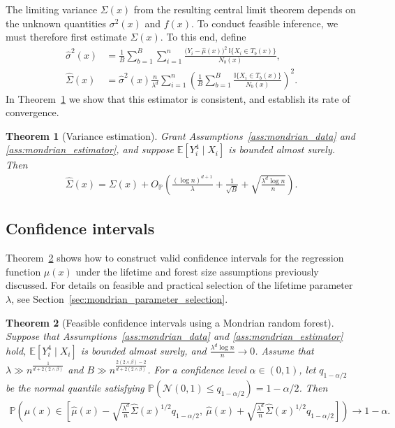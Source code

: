 \documentclass[11pt,lof]{puthesis}
\renewcommand{\P}{\ensuremath{\mathbb{P}}}
\newcommand{\E}{\ensuremath{\mathbb{E}}}
\newcommand{\I}{\ensuremath{\mathbb{I}}}
\newcommand{\cN}{\ensuremath{\mathcal{N}}}
\theoremstyle{break}
\newtheorem{theorem}{Theorem}[section]
\theoremstyle{proof}
\begin{document}
The limiting variance $\Sigma(x)$ from the resulting central limit theorem
depends on the unknown quantities $\sigma^2(x)$ and $f(x)$.
To conduct feasible inference, we must therefore first estimate
$\Sigma(x)$. To this end, define
%
\begin{align}
  \label{eq:mondrian_sigma2_hat}
  \hat\sigma^2(x)
  &=
  \frac{1}{B} \sum_{b=1}^{B} \sum_{i=1}^n
  \frac{\big(Y_i - \hat \mu(x)\big)^2 \, \I\{X_i \in T_b(x)\}} {N_b(x)}, \\
  \nonumber
  \hat\Sigma(x)
  &=
  \hat\sigma^2(x) \frac{n}{\lambda^d} \sum_{i=1}^n
  \left( \frac{1}{B} \sum_{b=1}^B \frac{\I\{X_i \in T_b(x)\}}{N_b(x)} \right)^2.
\end{align}
%
In Theorem~\ref{thm:mondrian_variance_estimation} we show that this
estimator is consistent, and establish its rate of convergence.
%
\begin{theorem}[Variance estimation]%
  \label{thm:mondrian_variance_estimation}
  Grant Assumptions~\ref{ass:mondrian_data} and \ref{ass:mondrian_estimator},
  and
  suppose $\E[Y_i^4 \mid X_i ]$ is bounded almost surely. Then
  \begin{align*}
    \hat\Sigma(x)
    = \Sigma(x)
    + O_\P \left(
      \frac{(\log n)^{d+1}}{\lambda}
      + \frac{1}{\sqrt B} + \sqrt{\frac{\lambda^d \log n}{n}}
    \right).
  \end{align*}

\end{theorem}

\subsection{Confidence intervals}

Theorem~\ref{thm:mondrian_confidence} shows how to construct valid confidence
intervals
for the regression function $\mu(x)$ under the lifetime and forest size
assumptions previously discussed. For details on feasible and practical
selection of the lifetime parameter $\lambda$, see
Section~\ref{sec:mondrian_parameter_selection}.
%
\begin{theorem}[Feasible confidence intervals using a Mondrian random forest]%
  \label{thm:mondrian_confidence}
  Suppose that Assumptions~\ref{ass:mondrian_data} and
  \ref{ass:mondrian_estimator} hold,
  $\E[Y_i^4 \mid X_i ]$ is bounded almost surely,
  and $\frac{\lambda^d \log n}{n} \to 0$. Assume that
  $\lambda \gg n^{\frac{1}{d + 2(2 \wedge \beta)}}$
  and $B \gg n^{\frac{2 (2 \wedge \beta) - 2}{d + 2 (2 \wedge \beta)}}$.
  For a confidence level $\alpha \in (0, 1)$,
  let $q_{1 - \alpha / 2}$ be the normal quantile satisfying
  $\P \left( \cN(0, 1) \leq q_{1 - \alpha / 2} \right) = 1 - \alpha / 2$. Then
  \begin{align*}
    \P \left(
      \mu(x) \in
      \left[
        \hat \mu(x)
        - \sqrt{\frac{\lambda^d}{n}} \hat \Sigma(x)^{1/2}
        q_{1 - \alpha / 2}, \
        \hat \mu(x)
        + \sqrt{\frac{\lambda^d}{n}} \hat \Sigma(x)^{1/2}
        q_{1 - \alpha / 2}
      \right]
    \right)
    \to
    1 - \alpha.
  \end{align*}

\end{theorem}
\end{document}
